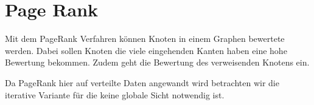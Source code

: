 \section{Page Rank}

Mit dem PageRank Verfahren können Knoten in einem Graphen bewertete werden. Dabei sollen Knoten die viele eingehenden Kanten haben eine hohe Bewertung bekommen. Zudem geht die Bewertung des verweisenden Knotens ein.

Da PageRank hier auf verteilte Daten angewandt wird betrachten wir die iterative Variante für die keine globale Sicht notwendig ist.

